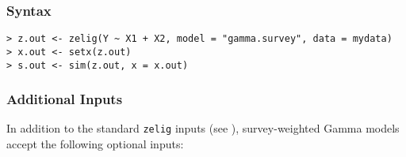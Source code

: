 \subsubsection{Syntax}

\begin{verbatim}
> z.out <- zelig(Y ~ X1 + X2, model = "gamma.survey", data = mydata)
> x.out <- setx(z.out)
> s.out <- sim(z.out, x = x.out)
\end{verbatim}


\subsubsection{Additional Inputs}

In addition to the standard {\tt zelig} inputs (see
), survey-weighted Gamma models accept the following
optional inputs:
